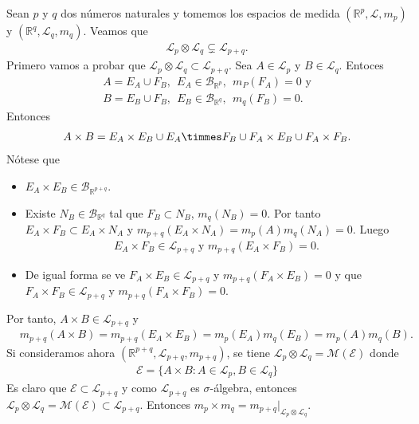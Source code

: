 \begin{obs}
Sean $p$ y $q$ dos números naturales y tomemos los espacios de medida $(\mathbb{R}^p, \mathcal{L}, m_p)$ y $(\mathbb{R}^q, \mathcal{L}_q, m_q)$. Veamos que
\begin{align*}
    \mathcal{L}_p \otimes \mathcal{L}_q \subsetneq \mathcal{L}_{p+q}.
\end{align*}
Primero vamos a probar que $\mathcal{L}_p \otimes \mathcal{L}_q \subset \mathcal{L}_{p+q}$. Sea $A \in \mathcal{L}_p$ y $B \in \mathcal{L}_q$. Entoces
\begin{align*}
    A = E_A \cup F_B, \ \ E_A \in \mathcal{B}_{\mathbb{R}^p}, \ \ m_P(F_A) = 0 \text{ y} \\
    B = E_B \cup F_B, \ \ E_B \in \mathcal{B}_{\mathbb{R}^q}, \ \ m_q(F_B) = 0.
\end{align*}
Entonces
\begin{align*}
    A \times B = E_A \times E_B \cup E_A \timmes F_B \cup F_A \times E_B \cup F_A \times F_B.
\end{align*}
Nótese que
\begin{itemize}
    \item $E_A \times E_B \in \mathcal{B}_{\mathbb{R}^{p+q}}$.
    \item Existe $N_B \in \mathcal{B}_{\mathbb{R}^{q}}$ tal que $F_B \subset N_B$, $m_q(N_B) = 0$. Por tanto $E_A \times F_B \subset E_A \times N_A$ y $m_{p+q}(E_A \times N_A) = m_p(A)m_q(N_A) = 0$. Luego
    \begin{align*}
    E_A \times F_B \in \mathcal{L}_{p +q} \text{ y } m_{p+q}(E_A \times F_B) = 0.
    \end{align*}
    \item De igual forma se ve $F_A \times E_B \in \mathcal{L}_{p +q}$ y $m_{p+q}(F_A \times E_B) = 0$ y que $F_A \times F_B \in \mathcal{L}_{p+q}$ y $m_{p+q}(F_A \times F_B) = 0$.
\end{itemize}
Por tanto, $A \times B \in \mathcal{L}_{p+q}$ y
\begin{align*}
    &m_{p+q}(A \times B) = m_{p+q}(E_A \times E_B) = m_p(E_A)m_q(E_B) = m_p(A)m_q(B).
\end{align*}
Si consideramos ahora $(\mathbb{R}^{p+q}, \mathcal{L}_{p+q}, m_{p+q})$, se tiene $\mathcal{L}_p \otimes \mathcal{L}_q = \mathcal{M}(\mathcal{E})$ donde
\begin{align*}
    \mathcal{E} = \{ A \times B : A \in \mathcal{L}_p, B \in \mathcal{L}_q \}
\end{align*}
Es claro que $\mathcal{E} \subset \mathcal{L}_{p+q}$ y como $\mathcal{L}_{p+q}$ es $\sigma$-álgebra, entonces $\mathcal{L}_p \otimes \mathcal{L}_q = \mathcal{M}(\mathcal{E}) \subset \mathcal{L}_{p+q}$. Entonces $m_p \times m_q = m_{p+q}|_{\mathcal{L}_p \otimes \mathcal{L}_q}$.

\end{obs}
